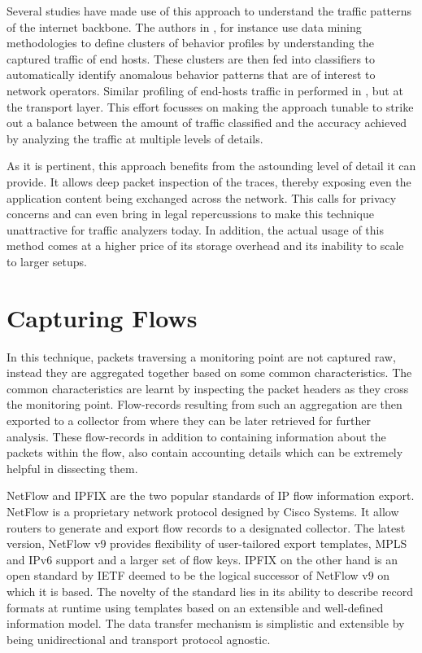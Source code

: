 Several studies have made use of this approach to understand the traffic patterns of the internet backbone. The authors in \cite{kxu:2005}, for instance use data mining methodologies to define clusters of behavior profiles by understanding the captured traffic of end hosts.  These clusters are then fed into classifiers to  automatically identify anomalous behavior patterns that are of interest to network operators. Similar profiling of end-hosts traffic in performed in \cite{tkaragiannis:2005}, but at the transport layer. This effort focusses on making the approach tunable to strike out a balance between the amount of traffic classified and the accuracy achieved by analyzing the traffic at multiple levels of details. 

As it is pertinent, this approach benefits from the astounding level of detail it can provide. It allows deep packet inspection of the traces, thereby exposing even the application content being exchanged  across the network. This calls for privacy concerns and can even bring in legal repercussions to make this technique unattractive for traffic analyzers today. In addition, the actual usage of this method comes at a higher price of its storage overhead and its inability to scale to larger setups.

\section{Capturing Flows}\label{sec:capturing-flows}
In this technique, packets traversing a monitoring point are not captured raw, instead they are aggregated together based on some common characteristics. The common characteristics are learnt by inspecting the packet headers as they cross the monitoring point. Flow-records resulting from such an aggregation are then exported to a collector from where they can be later retrieved for further analysis. These flow-records in addition to containing information about the packets within the flow, also contain accounting details which can be extremely helpful in dissecting them. 

NetFlow and \ac{IPFIX} are the two popular standards of \ac{IP} flow information export. NetFlow \cite{rfc3954} is a proprietary network protocol designed by Cisco Systems. It  allow routers to generate and export flow records to a designated collector. The latest version, NetFlow v$9$ provides flexibility of user-tailored export templates, \ac{MPLS} and \ac{IP}v$6$ support and a larger set of flow keys. \ac{IPFIX} \cite{rfc5101} on the other hand is an open standard by \ac{IETF} deemed to be the logical successor of NetFlow v$9$ on which it is based. The novelty of  the standard lies in its ability to describe record formats at runtime using templates based on an extensible and well-defined information model. The data transfer mechanism is simplistic and extensible by being unidirectional and transport protocol agnostic.  

